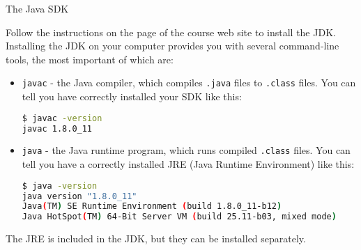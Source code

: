 \documentclass{beamer}
\begin{document}





\begin{frame}[fragile]{The Java SDK}

\vspace{-.05in}
Follow the instructions on the  page of the course web site to install the JDK. Installing the JDK on your computer provides you with several command-line tools, the most important of which are:

\begin{itemize}
\item {\tt javac} - the Java compiler, which compiles {\tt .java} files to {\tt .class} files.  You can tell you have correctly installed your SDK like this:
\begin{lstlisting}[language=bash]
$ javac -version
javac 1.8.0_11
\end{lstlisting}

\item {\tt java} - the Java runtime program, which runs compiled {\tt .class} files.  You can tell you have a correctly installed JRE (Java Runtime Environment) like this:
\begin{lstlisting}[language=bash]
$ java -version
java version "1.8.0_11"
Java(TM) SE Runtime Environment (build 1.8.0_11-b12)
Java HotSpot(TM) 64-Bit Server VM (build 25.11-b03, mixed mode)
\end{lstlisting}

\end{itemize}
\vspace{-.05in}
The JRE is included in the JDK, but they can be installed separately.

\end{frame}
\end{document}
